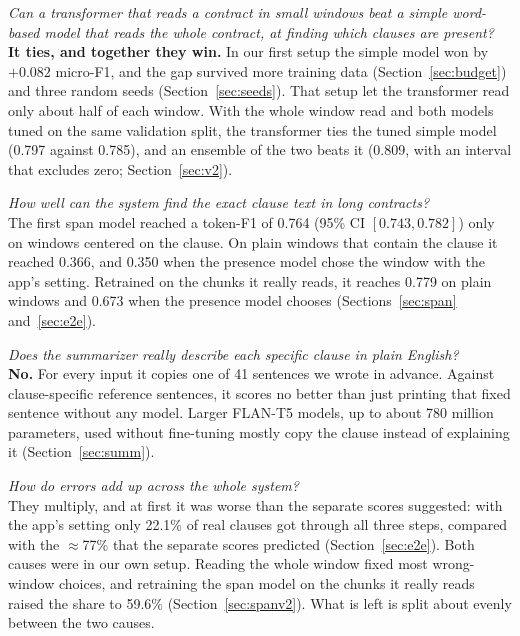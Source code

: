 \begin{description}[itemsep=4pt, leftmargin=1.6cm]
  \item[RQ1] \emph{Can a transformer that reads a contract in small windows beat a simple word-based model that reads the whole contract, at finding which clauses are present?}\\
  \textbf{It ties, and together they win.} In our first setup the simple model won by $+0.082$ micro-F1, and the gap survived more training data (Section~\ref{sec:budget}) and three random seeds (Section~\ref{sec:seeds}). That setup let the transformer read only about half of each window. With the whole window read and both models tuned on the same validation split, the transformer ties the tuned simple model (0.797 against 0.785), and an ensemble of the two beats it (0.809, with an interval that excludes zero; Section~\ref{sec:v2}).
  \item[RQ2] \emph{How well can the system find the exact clause text in long contracts?}\\
  The first span model reached a token-F1 of 0.764 (95\% CI $[0.743, 0.782]$) only on windows centered on the clause. On plain windows that contain the clause it reached 0.366, and 0.350 when the presence model chose the window with the app's setting. Retrained on the chunks it really reads, it reaches 0.779 on plain windows and 0.673 when the presence model chooses (Sections~\ref{sec:span} and~\ref{sec:e2e}).
  \item[RQ3] \emph{Does the summarizer really describe each specific clause in plain English?}\\
  \textbf{No.} For every input it copies one of 41 sentences we wrote in advance. Against clause-specific reference sentences, it scores no better than just printing that fixed sentence without any model. Larger FLAN-T5 models, up to about 780 million parameters, used without fine-tuning mostly copy the clause instead of explaining it (Section~\ref{sec:summ}).
  \item[RQ4] \emph{How do errors add up across the whole system?}\\
  They multiply, and at first it was worse than the separate scores suggested: with the app's setting only 22.1\% of real clauses got through all three steps, compared with the $\approx$77\% that the separate scores predicted (Section~\ref{sec:e2e}). Both causes were in our own setup. Reading the whole window fixed most wrong-window choices, and retraining the span model on the chunks it really reads raised the share to 59.6\% (Section~\ref{sec:spanv2}). What is left is split about evenly between the two causes.

\end{description}
